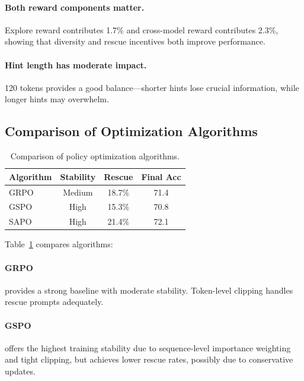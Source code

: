 \documentclass[11pt]{article}
\begin{document}
\paragraph{Both reward components matter.} Explore reward contributes 1.7\% and cross-model reward contributes 2.3\%, showing that diversity and rescue incentives both improve performance.

\paragraph{Hint length has moderate impact.} 120 tokens provides a good balance---shorter hints lose crucial information, while longer hints may overwhelm.

\subsection{Comparison of Optimization Algorithms}

\begin{table}[t]
    \centering
    \small
    \begin{tabular}{lccc}
        \toprule
        \textbf{Algorithm} & \textbf{Stability} & \textbf{Rescue} & \textbf{Final Acc} \\
        \midrule
        GRPO & Medium & 18.7\% & 71.4 \\
        GSPO & High & 15.3\% & 70.8 \\
        SAPO & High & 21.4\% & 72.1 \\
        \bottomrule
    \end{tabular}
    \caption{Comparison of policy optimization algorithms.}
    \label{tab:algorithms}
\end{table}

Table~\ref{tab:algorithms} compares algorithms:

\paragraph{GRPO} provides a strong baseline with moderate stability. Token-level clipping handles rescue prompts adequately.

\paragraph{GSPO} offers the highest training stability due to sequence-level importance weighting and tight clipping, but achieves lower rescue rates, possibly due to conservative updates.
\end{document}
